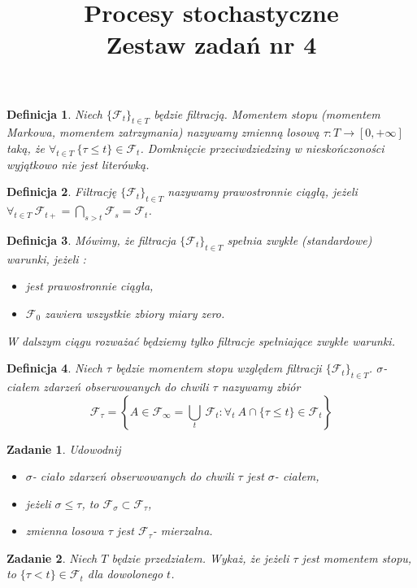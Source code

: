 \documentclass{mwart}
\title{Procesy stochastyczne\\ Zestaw zadań nr 4}
\newtheorem{df}{Definicja}
\newtheorem{zd}{Zadanie}
\begin{document}

\maketitle
\begin{df}
Niech $\{\mathcal{F}_t\}_{t\in T}$ będzie filtracją. Momentem stopu (momentem Markowa, momentem zatrzymania) nazywamy zmienną losową $\tau \colon T \to [0, +\infty]$ taką, że $\forall_{t\in T}\ \{\tau \leq t\} \in \mathcal{F}_t$. Domknięcie przeciwdziedziny w nieskończoności wyjątkowo nie jest literówką.
\end{df}
\begin{df}
Filtrację $\{\mathcal{F}_t\}_{t\in T}$ nazywamy prawostronnie ciągłą, jeżeli $\forall_{t\in T}\ \mathcal{F}_{t+} = \bigcap_{s >t}\mathcal{F}_{s} = \mathcal{F}_{t}$.
\end{df}
\begin{df}
Mówimy, że filtracja $\{\mathcal{F}_t\}_{t\in T}$  spełnia zwykłe (standardowe) warunki, jeżeli :
\begin{itemize}
\item jest prawostronnie ciągła,
\item $\mathcal{F}_{0}$ zawiera wszystkie zbiory miary zero.
\end{itemize}
W dalszym ciągu rozważać będziemy tylko filtracje spełniające zwykłe warunki.
\end{df}
\begin{df}
Niech $\tau$ będzie momentem stopu względem filtracji $\{\mathcal{F}_t\}_{t\in T}$. $\sigma$- ciałem zdarzeń obserwowanych do chwili $\tau$ nazywamy zbiór
\begin{displaymath}
\mathcal{F}_{\tau} = \left\{A \in \mathcal{F}_{\infty} = \bigcup_t\ \mathcal{F}_t\colon \forall_t\ A\cap \{\tau \leq t\} \in \mathcal{F}_t\right\}
\end{displaymath}
\end{df}
\begin{zd}
Udowodnij
\begin{itemize}
\item  $\sigma$- ciało zdarzeń obserwowanych do chwili $\tau$ jest $\sigma$- ciałem,
\item jeżeli $\sigma \leq \tau$, to $\mathcal{F}_{\sigma} \subset \mathcal{F}_{\tau}$,
\item zmienna losowa $\tau$ jest $\mathcal{F}_{\tau}$- mierzalna.
\end{itemize}
\end{zd}

\begin{zd}
Niech $T$ będzie przedziałem. Wykaż, że jeżeli $\tau$ jest momentem stopu, to $\{\tau < t\} \in \mathcal{F}_{t}$ dla dowolonego $t$.
\end{zd}
\end{document}
